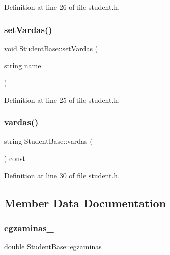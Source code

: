 Definition at line 26 of file student.\+h.

\mbox{\label{class_student_base_ad3d2ec87d8481a846d06fbdaae88aec1}} 
\subsubsection{\texorpdfstring{setVardas()}{setVardas()}}
{\footnotesize\ttfamily void Student\+Base\+::set\+Vardas (\begin{DoxyParamCaption}\item[{string}]{name }\end{DoxyParamCaption})\hspace{0.3cm}{\ttfamily [inline]}}



Definition at line 25 of file student.\+h.

\mbox{\label{class_student_base_a6fe791399496f3b4b0c9d910472b2232}} 
\subsubsection{\texorpdfstring{vardas()}{vardas()}}
{\footnotesize\ttfamily string Student\+Base\+::vardas (\begin{DoxyParamCaption}{ }\end{DoxyParamCaption}) const\hspace{0.3cm}{\ttfamily [inline]}}



Definition at line 30 of file student.\+h.



\subsection{Member Data Documentation}
\mbox{\label{class_student_base_a570c3b4ff3d867280b15cf4d680a6cf7}} 
\subsubsection{\texorpdfstring{egzaminas\_}{egzaminas\_}}
{\footnotesize\ttfamily double Student\+Base\+::egzaminas\+\_\+\hspace{0.3cm}{\ttfamily [protected]}}



